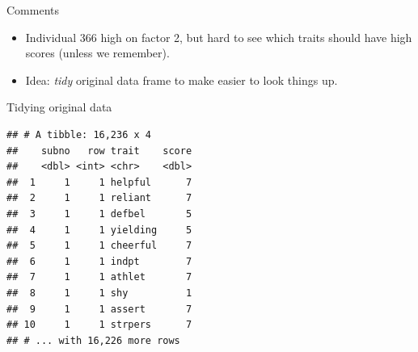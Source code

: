 \documentclass[
  ignorenonframetext,
]{beamer}
\newenvironment{Shaded}{\begin{snugshade}}{\end{snugshade}}
\newcommand{\DataTypeTok}[1]{\textcolor[rgb]{0.13,0.29,0.53}{#1}}
\newcommand{\KeywordTok}[1]{\textcolor[rgb]{0.13,0.29,0.53}{\textbf{#1}}}
\newcommand{\NormalTok}[1]{#1}
\newcommand{\OperatorTok}[1]{\textcolor[rgb]{0.81,0.36,0.00}{\textbf{#1}}}
\newcommand{\StringTok}[1]{\textcolor[rgb]{0.31,0.60,0.02}{#1}}
\begin{document}
\begin{frame}{Comments}
\protect\hypertarget{comments-41}{}

\begin{itemize}
\item
  Individual 366 high on factor 2, but hard to see which traits should
  have high scores (unless we remember).
\item
  Idea: \emph{tidy} original data frame to make easier to look things
  up.
\end{itemize}

\end{frame}

\begin{frame}[fragile]{Tidying original data}
\protect\hypertarget{tidying-original-data}{}

\scriptsize

\begin{Shaded}
\end{Shaded}

\begin{verbatim}
## # A tibble: 16,236 x 4
##    subno   row trait    score
##    <dbl> <int> <chr>    <dbl>
##  1     1     1 helpful      7
##  2     1     1 reliant      7
##  3     1     1 defbel       5
##  4     1     1 yielding     5
##  5     1     1 cheerful     7
##  6     1     1 indpt        7
##  7     1     1 athlet       7
##  8     1     1 shy          1
##  9     1     1 assert       7
## 10     1     1 strpers      7
## # ... with 16,226 more rows
\end{verbatim}

\normalsize

\end{frame}
\end{document}
